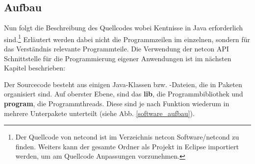 \documentclass[a4paper,14pt,headsepline]{scrartcl}
\begin{document}
\begin{figure}[h]
\begin{center}
\end{center}
\end{figure}
\newpage

\subsection{Aufbau}

Nun folgt die Beschreibung des Quellcodes wobei Kentnisse in Java erforderlich sind.\footnote{Der Quellcode von netcond ist im Verzeichnis netcon Software/netcond zu finden. Weiters kann der gesamte Ordner als Projekt in Eclipse importiert werden, um am Quellcode Anpassungen vorzunehmen.} Erläutert werden dabei nicht die Programmzeilen im einzelnen, sondern für das Verständnis relevante Programmteile. Die Verwendung der netcon API Schnittstelle für die Programmierung eigener Anwendungen ist im nächsten Kapitel beschrieben: 

Der Sourcecode besteht aus einigen Java-Klassen bzw. -Dateien, die in Paketen organisiert sind. Auf oberster Ebene, sind das \textbf{lib}, die Programmbibliothek und \textbf{program}, die Programmthreads. Diese sind je nach Funktion wiederum in mehrere Unterpakete unterteilt (siehe Abb. \ref{software_aufbau}).
\end{document}
